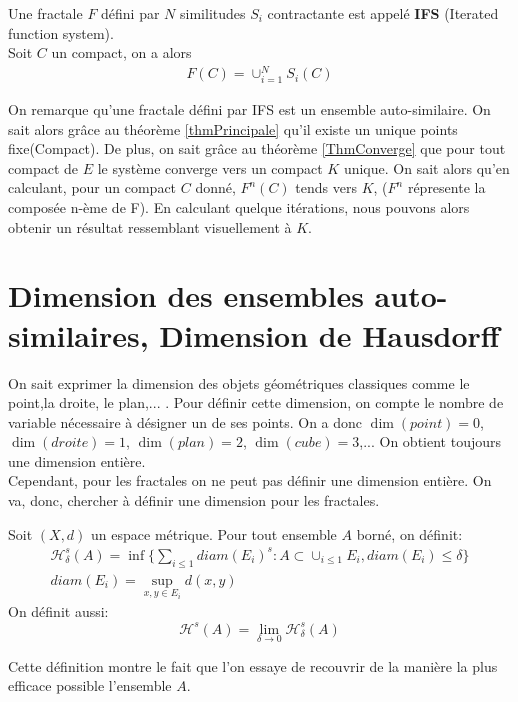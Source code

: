 \documentclass[a4paper, 12pt]{report}
\begin{document}
			\begin{definition}
				Une fractale $F$ défini par $N$ similitudes $S_i$ contractante est appelé \textbf{IFS} (Iterated function system).\\
				Soit $C$ un compact, on a alors
				\begin{align*}
					F(C)=\cup^N_{i=1}S_i(C)
				\end{align*}

			\end{definition}
			
			\hspace{.7 cm}On remarque qu'une fractale défini par IFS est un ensemble auto-similaire. On sait alors grâce au théorème \ref{thmPrincipale} qu'il existe un unique points fixe(Compact). De plus, on sait grâce au théorème \ref{ThmConverge} que pour tout compact de $E$ le système converge vers un compact $K$ unique. On sait alors qu'en calculant, pour un compact $C$ donné, $F^n(C)$ tends vers $K$, ($F^n$ répresente la composée n-ème de F). En calculant quelque itérations, nous pouvons alors obtenir un résultat ressemblant visuellement à $K$.

	\chapter{\bf Dimension des ensembles auto-similaires, Dimension de Hausdorff}
		On sait exprimer la dimension des objets géométriques classiques comme le point,la droite, le plan,... . Pour définir cette dimension, on compte le nombre de variable nécessaire à désigner un de ses points. On a donc $\dim(point)=0$, $\dim(droite)=1$, $\dim(plan)=2$, $\dim(cube)=3$,... On obtient toujours une dimension entière.\\
		Cependant, pour les fractales on ne peut pas définir une dimension entière. On va, donc, chercher à définir une dimension pour les fractales.
			
			\begin{definition}
				Soit $(X,d)$ un espace métrique. Pour tout ensemble $A$ borné, on définit:
				\begin{align*}
					\mathscr{H}^s_\delta(A)=\inf\{\sum_{i\leq1}diam(E_i)^s:A\subset\cup_{i\leq1}E_i,diam(E_i)\leq\delta\}\\
					diam(E_i)=\sup_{x,y\in E_i}d(x,y)
					\end{align*}
				On définit aussi:
				\begin{equation*}
					\mathscr{H}^s(A)=\lim_{\delta\rightarrow0}\mathscr{H}^s_\delta(A)
				\end{equation*}
			\end{definition}
			\hspace{0.7 cm} Cette définition montre le fait que l'on essaye de recouvrir de la manière la plus efficace possible l'ensemble $A$.
			
\end{document}
